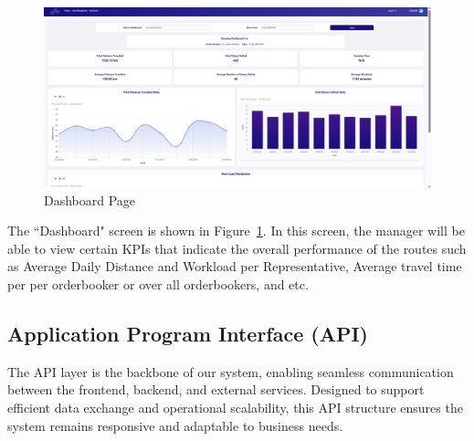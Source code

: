 
\begin{figure}[H]
    \centering
    \includegraphics[width=1\textwidth]{images/Dashboard 2.png} %
    \caption{Dashboard Page}
    \label{fig:image7}
\end{figure}
The ``Dashboard" screen is shown in Figure~\ref{fig:image7}. In this screen, the manager will be able to view certain KPIs that indicate the overall performance of the routes such as Average Daily Distance and Workload per Representative, Average travel time per per orderbooker or over all orderbookers, and etc. 

\subsection{Application Program Interface (API)}
The API layer is the backbone of our system, enabling seamless communication between the frontend, backend, and external services. Designed to support efficient data exchange and operational scalability, this API structure ensures the system remains responsive and adaptable to business needs.

